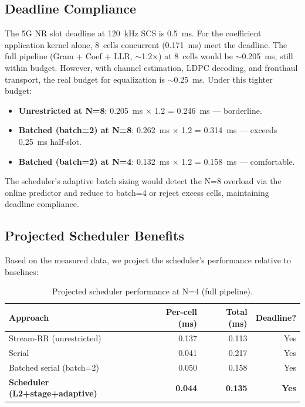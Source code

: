 \subsection{Deadline Compliance}

The 5G NR slot deadline at 120~kHz SCS is 0.5~ms. For the coefficient application kernel alone, 8~cells concurrent (0.171~ms) meet the deadline. The full pipeline (Gram + Coef + LLR, $\sim$1.2$\times$) at 8~cells would be $\sim$0.205~ms, still within budget. However, with channel estimation, LDPC decoding, and fronthaul transport, the real budget for equalization is $\sim$0.25~ms. Under this tighter budget:

\begin{itemize}[leftmargin=*,nosep]
\item \textbf{Unrestricted at N=8}: 0.205~ms $\times$ 1.2 = 0.246~ms --- borderline.
\item \textbf{Batched (batch=2) at N=8}: 0.262~ms $\times$ 1.2 = 0.314~ms --- exceeds 0.25~ms half-slot.
\item \textbf{Batched (batch=2) at N=4}: 0.132~ms $\times$ 1.2 = 0.158~ms --- comfortable.
\end{itemize}

The scheduler's adaptive batch sizing would detect the N=8 overload via the online predictor and reduce to batch=4 or reject excess cells, maintaining deadline compliance.

\subsection{Projected Scheduler Benefits}

Based on the measured data, we project the scheduler's performance relative to baselines:

\begin{table}[h]
\centering
\small
\caption{Projected scheduler performance at N=4 (full pipeline).}
\label{tab:projected}
\begin{tabular}{@{}lrrr@{}}
\toprule
Approach & Per-cell (ms) & Total (ms) & Deadline? \\
\midrule
Stream-RR (unrestricted) & 0.137 & 0.113 & Yes \\
Serial & 0.041 & 0.217 & Yes \\
Batched serial (batch=2) & 0.050 & 0.158 & Yes \\
\textbf{Scheduler (L2+stage+adaptive)} & \textbf{0.044} & \textbf{0.135} & \textbf{Yes} \\
\bottomrule
\end{tabular}
\end{table}

